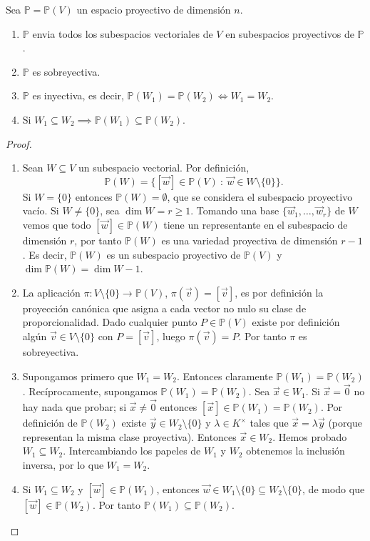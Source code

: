 \begin{proposición}
    Sea $\mathbb{P} = \mathbb{P}(V)$ un espacio proyectivo de dimensión $n$.
    \vspace{-1em}
    \begin{enumerate}
        \item $\mathbb{P}$ envia todos los subespacios vectoriales de $V$ en subespacios proyectivos de $\mathbb{P}$.
        \item $\mathbb{P}$ es sobreyectiva.
        \item $\mathbb{P}$ es inyectiva, es decir, $\mathbb{P}(W_1) = \mathbb{P}(W_2) \iff W_1 = W_2$.
        \item Si $W_1 \subseteq W_2 \implies \mathbb{P}(W_1) \subseteq \mathbb{P}(W_2)$.
    \end{enumerate}
\end{proposición}

\begin{proof}
    \leavevmode
    \begin{enumerate}
        \item Sean $W\subseteq V$ un subespacio vectorial. Por definición,
        \[
        \mathbb{P}(W)=\{[\vec w]\in\mathbb{P}(V)\ :\ \vec w\in W\setminus\{0\}\}.
        \]
        Si $W=\{0\}$ entonces $\mathbb{P}(W)=\emptyset$, que se considera el subespacio proyectivo vacío. Si $W\neq\{0\}$, sea $\dim W = r\ge 1$. Tomando una base $\{\vec w_1,\dots,\vec w_r\}$ de $W$ vemos que todo $[\vec w]\in\mathbb{P}(W)$ tiene un representante en el subespacio de dimensión $r$, por tanto $\mathbb{P}(W)$ es una variedad proyectiva de dimensión $r-1$. Es decir, $\mathbb{P}(W)$ es un subespacio proyectivo de $\mathbb{P}(V)$ y $\dim\mathbb{P}(W)=\dim W-1$.
        \item La aplicación $\pi:V\setminus\{0\}\to\mathbb{P}(V)$, $\pi(\vec v)=[\vec v]$, es por definición la proyección canónica que asigna a cada vector no nulo su clase de proporcionalidad. Dado cualquier punto $P\in\mathbb{P}(V)$ existe por definición algún $\vec v\in V\setminus\{0\}$ con $P=[\vec v]$, luego $\pi(\vec v)=P$. Por tanto $\pi$ es sobreyectiva.
        \item Supongamos primero que $W_1=W_2$. Entonces claramente $\mathbb{P}(W_1)=\mathbb{P}(W_2)$. Recíprocamente, supongamos $\mathbb{P}(W_1)=\mathbb{P}(W_2)$. Sea $\vec x\in W_1$. Si $\vec x=\vec0$ no hay nada que probar; si $\vec x\neq\vec0$ entonces $[\vec x]\in\mathbb{P}(W_1)=\mathbb{P}(W_2)$. Por definición de $\mathbb{P}(W_2)$ existe $\vec y\in W_2\setminus\{0\}$ y $\lambda\in K^\times$ tales que $\vec x=\lambda\vec y$ (porque representan la misma clase proyectiva). Entonces $\vec x\in W_2$. Hemos probado $W_1\subseteq W_2$. Intercambiando los papeles de $W_1$ y $W_2$ obtenemos la inclusión inversa, por lo que $W_1=W_2$.
        \item Si $W_1\subseteq W_2$ y $[\vec w]\in\mathbb{P}(W_1)$, entonces $\vec w\in W_1\setminus\{0\}\subseteq W_2\setminus\{0\}$, de modo que $[\vec w]\in\mathbb{P}(W_2)$. Por tanto $\mathbb{P}(W_1)\subseteq\mathbb{P}(W_2)$.
    \end{enumerate}
\end{proof}

